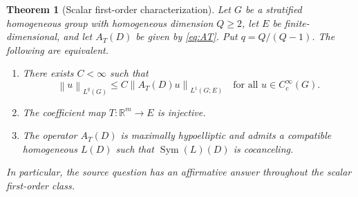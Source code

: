 \documentclass[11pt]{article}
\newtheorem{theorem}{Theorem}
\newcommand{\R}{\mathbb R}
\newcommand{\norm}[1]{\left\lVert#1\right\rVert}
\newcommand{\Sym}{\operatorname{Sym}}
\begin{document}
\begin{theorem}[Scalar first-order characterization]\label{thm:main}
Let $G$ be a stratified homogeneous group with homogeneous dimension $Q\ge2$,
let $E$ be finite-dimensional, and let $A_T(D)$ be given by
\eqref{eq:AT}.  Put $q=Q/(Q-1)$.  The following are equivalent.
\begin{enumerate}
\item There exists $C<\infty$ such that
\begin{equation}\label{eq:endpoint}
 \norm{u}_{L^q(G)}\le C\norm{A_T(D)u}_{L^1(G;E)}
 \quad\text{for all }u\in C_c^\infty(G).
\end{equation}
\item The coefficient map $T:\R^m\to E$ is injective.
\item The operator $A_T(D)$ is maximally hypoelliptic and admits a compatible
homogeneous $L(D)$ such that $\Sym(L)(D)$ is cocanceling.
\end{enumerate}
In particular, the source question has an affirmative answer throughout the
scalar first-order class.
\end{theorem}
\end{document}
